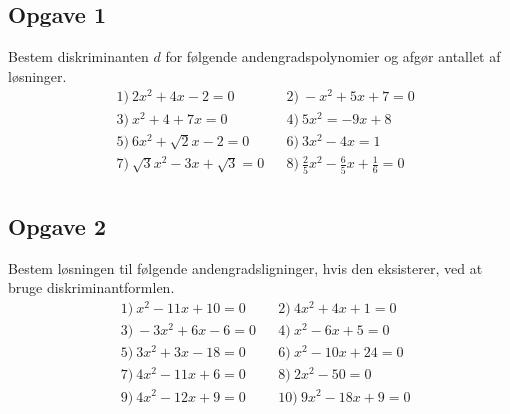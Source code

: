 \subsection*{Opgave 1}

Bestem diskriminanten $d$ for følgende andengradspolynomier og afgør antallet af løsninger. 
\begin{align*}
	&1) \ 2x^2 + 4x - 2 = 0    &   &2) \ -x^2 + 5x + 7 = 0    \\
	&3) \ x^2 + 4 + 7x = 0    &   &4) \ 5x^2 = -9x + 8    \\
	&5) \ 6x^2 + \sqrt{2}x - 2 = 0    &   &6) \ 3x^2 - 4x = 1    \\
	&7) \ \sqrt{3}x^2 -3x + \sqrt{3} = 0    &   &8) \ \frac{2}{5}x^2 - \frac{6}{5}x + \frac{1}{6} = 0    \\
\end{align*}

\subsection*{Opgave 2}
Bestem løsningen til følgende andengradsligninger, hvis den eksisterer, ved at bruge diskriminantformlen.
\begin{align*}
	&1) \ x^2 - 11x + 10 = 0 &  &2) \ 4x^2 + 4x + 1 = 0\\
	&3) \ -3x^2 + 6x - 6 = 0 &  &4) \ x^2 - 6x + 5 = 0\\
	&5) \ 3x^2 + 3x - 18 = 0 &  &6) \ x^2 - 10x + 24 = 0\\
	&7) \ 4x^2 - 11x + 6 = 0  &  &8) \ 2x^2 - 50 = 0\\
	&9) \ 4x^2 - 12x + 9 = 0 &  &10) \ 9x^2 - 18x + 9 = 0\\	
 \end{align*}

